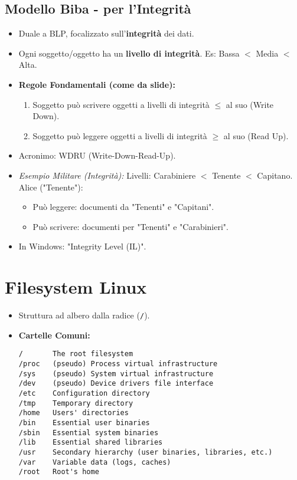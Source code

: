 \subsection{Modello Biba - per l'Integrità}
\begin{itemize}
    \item Duale a BLP, focalizzato sull'\textbf{integrità} dei dati.
    \item Ogni soggetto/oggetto ha un \textbf{livello di integrità}. Es: Bassa $<$ Media $<$ Alta.
    \item \textbf{Regole Fondamentali (come da slide):}
    \begin{enumerate}
        \item Soggetto può scrivere oggetti a livelli di integrità $\leq$ al suo (Write Down).
        \item Soggetto può leggere oggetti a livelli di integrità $\geq$ al suo (Read Up).
    \end{enumerate}
    \item Acronimo: WDRU (Write-Down-Read-Up).
    \item \textit{Esempio Militare (Integrità):} Livelli: Carabiniere $<$ Tenente $<$ Capitano.
    Alice ("Tenente"):
    \begin{itemize}
        \item Può leggere: documenti da "Tenenti" e "Capitani".
        \item Può scrivere: documenti per "Tenenti" e "Carabinieri".
    \end{itemize}
    \item In Windows: "Integrity Level (IL)".
\end{itemize}

\section{Filesystem Linux}
\begin{itemize}
    \item Struttura ad albero dalla radice (\texttt{/}).
    \item \textbf{Cartelle Comuni:}
    \begin{verbatim}
/       The root filesystem
/proc   (pseudo) Process virtual infrastructure
/sys    (pseudo) System virtual infrastructure
/dev    (pseudo) Device drivers file interface
/etc    Configuration directory
/tmp    Temporary directory
/home   Users' directories
/bin    Essential user binaries
/sbin   Essential system binaries
/lib    Essential shared libraries
/usr    Secondary hierarchy (user binaries, libraries, etc.)
/var    Variable data (logs, caches)
/root   Root's home
    \end{verbatim}
\end{itemize}

